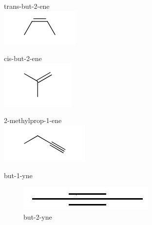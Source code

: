\documentclass[10pt]{article}
\begin{document}
trans-but-2-ene\\
\includegraphics{smile-4e3263dbe0063fb7011f0228b289f87a9daf5db8}

cis-but-2-ene\\
\includegraphics{smile-00f22c15b39587d8094e7b844147abd44453175a}

2-methylprop-1-ene\\
\includegraphics{smile-1bd32dcee57ebfeda3ee19fa8564eec9a57c3b15}

but-1-yne

\begin{figure}[h]
\begin{center}
  \includegraphics[width=\textwidth]{2025_10_23_ed7118e3280f74e91193g-25}
\captionsetup{labelformat=empty}
\caption{but-2-yne}
\end{center}
\end{figure}
\end{document}
